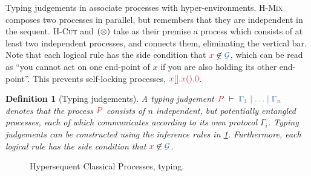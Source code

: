 \documentclass[submission,copyright,creativecommons]{eptcs}
\newtheorem{definition}[lemma]{Definition}
\begin{document}
Typing judgements in \hcp associate processes with hyper-environments. \textsc{H-Mix} composes two processes in parallel, but remembers that they are independent in the sequent. \textsc{H-Cut} and $(\otimes)$ take as their premise a process which consists of at least two independent processes, and connects them, eliminating the vertical bar. Note that each logical rule has the side condition that $\tm{x} \not\in \ty{\mathcal{G}}$, which can be read as ``you cannot act on one end-point of $x$ if you are also holding its other end-point''. This prevents self-locking processes, \eg $\tm{\piBoundSend{x}{}{\piRecv{x}{}{\piHalt}}}$.
\begin{definition}[Typing judgements]\label{def:hcp}
  A typing judgement $\seq[P]{\Gamma_1 \hsep \dots \hsep \Gamma_n}$ denotes that the process $\tm{P}$ consists of $n$ independent, but potentially entangled processes, each of which communicates according to its own protocol $\Gamma_i$. 
  Typing judgements can be constructed using the inference rules in
  \cref{fig:hcp}.
  Furthermore, each logical rule has the side condition that $\tm{x} \not\in \ty{\mathcal{G}}$.
\end{definition}\noindent
\begin{figure}[htb]
  \begin{center}\hccpInfAx        \hccpInfCycle \end{center}
  \begin{center}\hccpInfMix       \hccpInfHalt  \end{center}
  \begin{center}\hccpInfBoundTens \hccpInfParr  \end{center}
  \begin{center}\hccpInfOne       \hccpInfBot   \end{center}
  \begin{center}      \end{center}
  \begin{center}\hccpInfWith                    \end{center}
  \begin{center}\hccpInfNil       \hccpInfTop   \end{center}
  \caption{Hypersequent Classical Processes, typing.}
  \label{fig:hcp}
\end{figure}
\end{document}
